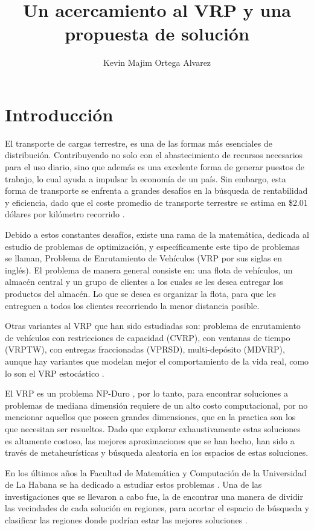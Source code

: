 \documentclass{report}
\title {Un acercamiento al VRP y una propuesta de solución}
\author {Kevin Majim Ortega Alvarez}
\begin{document}
\maketitle
\section {Introducción}

El transporte de cargas terrestre, es una de las formas más esenciales de distribución. Contribuyendo no solo con el abastecimiento de recursos necesarios para el uso diario, sino que además es una excelente forma de generar puestos de trabajo, lo cual ayuda a impulsar la economía de un país. Sin embargo, esta forma de transporte se enfrenta a grandes desafíos en la búsqueda de rentabilidad y eficiencia, dado que el coste promedio de transporte terrestre se estima en \$2.01 dólares por kilómetro recorrido \cite{ref1}.


Debido a estos constantes desafíos, existe una rama de la matemática, dedicada al estudio de problemas de optimización, y específicamente este tipo de problemas se llaman, Problema de Enrutamiento de Vehículos (VRP por sus siglas en inglés). El problema de manera general consiste en: una flota de vehículos, un almacén central y un grupo de clientes a los cuales se les desea entregar los productos del almacén. Lo que se desea es organizar la flota, para que les entreguen a todos los clientes recorriendo la menor distancia posible. 


Otras variantes al VRP que han sido estudiadas son: problema de enrutamiento de vehículos con restricciones de capacidad (CVRP), con ventanas de tiempo (VRPTW), con entregas fraccionadas (VPRSD), multi-depósito (MDVRP), aunque hay variantes que modelan mejor el comportamiento de la vida real, como lo son el VRP estocástico \cite{ref2}.


El VRP es un problema NP-Duro \cite{ref3}, por lo tanto, para encontrar soluciones a problemas de mediana dimensión requiere de un alto costo computacional, por no mencionar aquellos que poseen grandes dimensiones, que en la practica son los que necesitan ser resueltos. Dado que explorar exhaustivamente estas soluciones es altamente costoso, las mejores aproximaciones que se han hecho, han sido a través de metaheurísticas \cite{ref} y búsqueda aleatoria en los espacios de estas soluciones.


En los últimos años la Facultad de Matemática y Computación de la Universidad de La Habana se ha dedicado a estudiar estos problemas \cite{ref5}\cite{ref6}. Una de las investigaciones que se llevaron a cabo fue, la de encontrar una manera de dividir las vecindades de cada solución en regiones, para acortar el espacio de búsqueda y clasificar las regiones donde podrían estar las mejores soluciones \cite{ref7}. 
\end{document}
